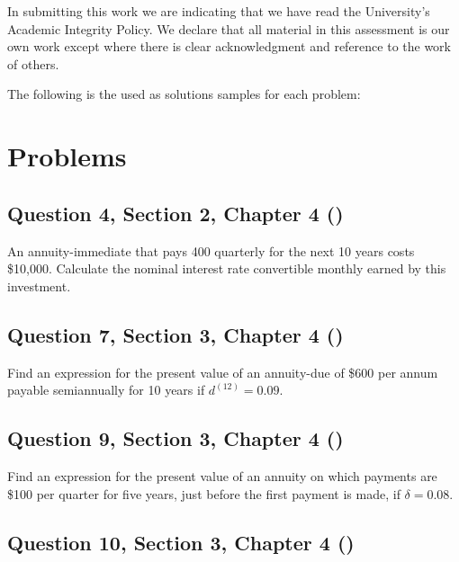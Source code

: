 \documentclass[12pt, a4paper]{article}
\begin{document}
\begin{titlepage}
    
    \vspace{0.5cm}
    
    {\footnotesize In submitting this work we are indicating
    that we have read the University's Academic Integrity Policy. We
    declare that all material in this assessment is our own work except
    where there is clear acknowledgment and reference to the work of
    others.\par}
\end{titlepage}
The following is the used as solutions samples for each problem:
\newpage
\section*{Problems}
\subsection*{Question 4, Section 2, Chapter 4  (\cite{toi3rd})}

\noindent An annuity-immediate that pays 400 quarterly for the next 10 years costs \$10{,}000. Calculate the nominal interest rate convertible monthly earned by this investment.

\subsection*{Question 7, Section 3, Chapter 4  (\cite{toi3rd})}

\noindent Find an expression for the present value of an annuity-due of \$600 per annum payable semiannually for 10 years if \( d^{(12)} = 0.09. \)

\subsection*{Question 9, Section 3, Chapter 4  (\cite{toi3rd})}

\noindent Find an expression for the present value of an annuity on which payments are \$100 per quarter for five years, just before the first payment is made, if \( \delta = 0.08. \)

\subsection*{Question 10, Section 3, Chapter 4  (\cite{toi3rd})}
\end{document}
